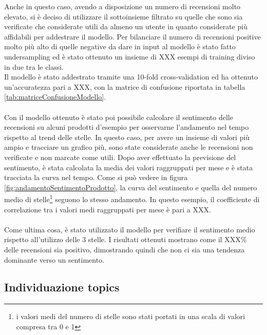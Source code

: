 Anche in questo caso, avendo a disposizione un numero di recensioni molto elevato, si è deciso di utilizzare il sottoinsieme filtrato su quelle che sono sia verificate che considerate utili da almeno un utente in quanto considerate più affidabili per addestrare il modello. Per bilanciare il numero di recensioni positive molto più alto di quelle negative da dare in input al modello è stato fatto undersampling ed è stato ottenuto un insieme di XXX esempi di training diviso in due tra le classi. \\
Il modello è stato addestrato tramite una 10-fold cross-validation ed ha ottenuto un'accuratezza pari a XXX, con la matrice di confusione riportata in tabella \ref{tab:matriceConfusioneModello}. \\\\
Con il modello ottenuto è stato poi possibile calcolare il sentimento delle recensioni su alcuni prodotti d'esempio per osservarne l'andamento nel tempo rispetto al trend delle stelle. In questo caso, per avere un insieme di valori più ampio e tracciare un grafico più, sono state considerate anche le recensioni non verificate e non marcate come utili. Dopo aver effettuato la previsione del sentimento, è stata calcolata la media dei valori raggruppati per mese e è stata tracciata la curva nel tempo. Come si può vedere in figura \ref{fig:andamentoSentimentoProdotto}, la curva del sentimento e quella del numero medio di stelle\footnote{i valori medi del numero di stelle sono stati portati in una scala di valori compresa tra 0 e 1} seguono lo stesso andamento. In questo esempio, il coefficiente di correlazione tra i valori medi raggruppati per mese è pari a XXX. \\\\


Come ultima cosa, è stato utilizzato il modello per verifiare il sentimento medio rispetto all'utilizzo delle 3 stelle. I risultati ottenuti mostrano come il XXX\% delle recensioni sia positivo, dimostrando quindi che non ci sia una tendenza dominante verso un sentimento.

\subsection{Individuazione topics} %
